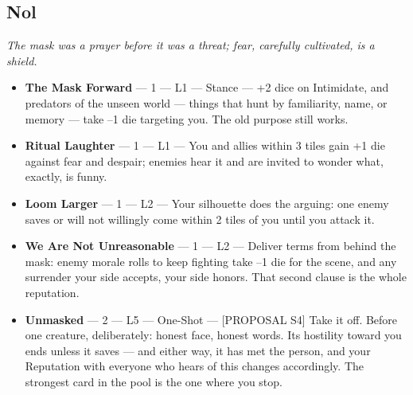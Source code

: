 \subsection{Nol}
\textit{The mask was a prayer before it was a threat; fear, carefully cultivated, is a shield.}
\begin{itemize}
    \item \textbf{The Mask Forward} --- 1 --- L1 --- Stance --- +2 dice on Intimidate, and predators of the unseen world --- things that hunt by familiarity, name, or memory --- take --1 die targeting you. The old purpose still works.
    \item \textbf{Ritual Laughter} --- 1 --- L1 --- You and allies within 3 tiles gain +1 die against fear and despair; enemies hear it and are invited to wonder what, exactly, is funny.
    \item \textbf{Loom Larger} --- 1 --- L2 --- Your silhouette does the arguing: one enemy saves or will not willingly come within 2 tiles of you until you attack it.
    \item \textbf{We Are Not Unreasonable} --- 1 --- L2 --- Deliver terms from behind the mask: enemy morale rolls to keep fighting take --1 die for the scene, and any surrender your side accepts, your side honors. That second clause is the whole reputation.
    \item \textbf{Unmasked} --- 2 --- L5 --- One-Shot --- [PROPOSAL S4] Take it off. Before one creature, deliberately: honest face, honest words. Its hostility toward you ends unless it saves --- and either way, it has met the person, and your Reputation with everyone who hears of this changes accordingly. The strongest card in the pool is the one where you stop.
\end{itemize}

